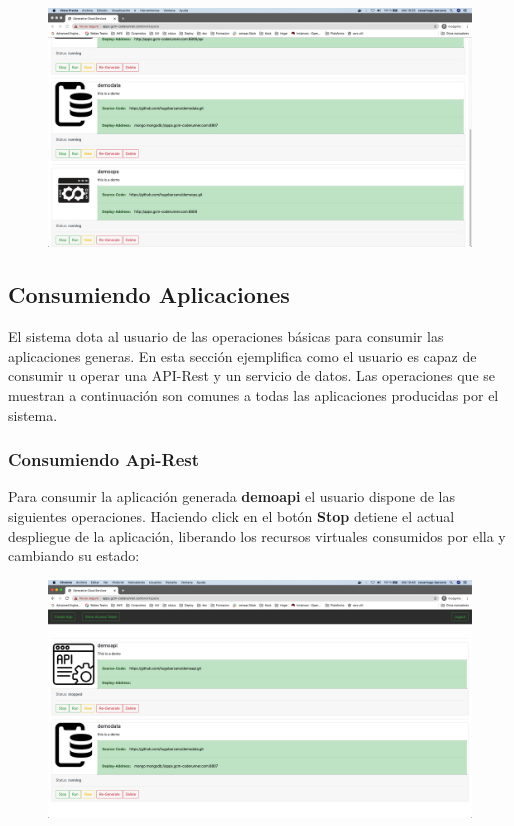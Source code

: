 \documentclass[a4paper,11pt]{book}
\begin{document}
\begin{figure}[H]
\centering
\includegraphics[scale=0.2]{imagenes/casouso/1_2.png}
\caption{   }
\end{figure}

\subsection{Consumiendo Aplicaciones}

El sistema dota al usuario de las operaciones básicas para consumir las aplicaciones generas. En esta sección ejemplifica como el usuario es capaz de consumir u operar una API-Rest y un servicio de datos. Las operaciones que se muestran a continuación son comunes a todas las aplicaciones producidas por el sistema. 

\subsubsection{Consumiendo Api-Rest}
Para consumir la aplicación generada \textbf{demoapi} el usuario dispone de las siguientes operaciones. Haciendo click en el botón \textbf{Stop} detiene el actual despliegue de la aplicación, liberando los recursos virtuales consumidos por ella y cambiando su estado:

\begin{figure}[H]
\centering
\includegraphics[scale=0.2]{imagenes/casouso/1_3.png}
\caption{   }
\end{figure}
\end{document}
